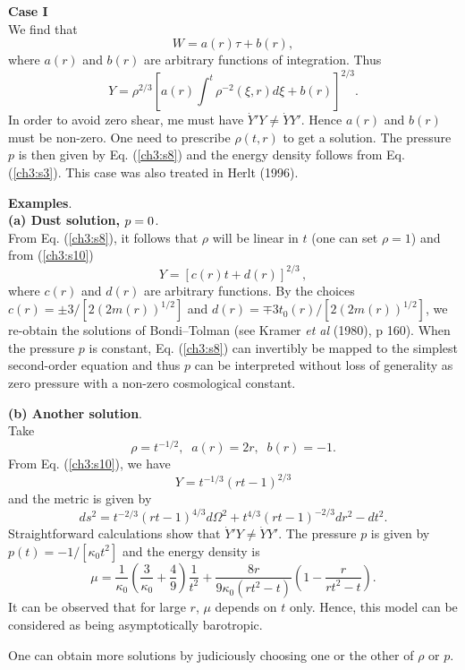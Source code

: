 {{\bf Case I  }\\
We find that
\[ W=a(r)\tau+b(r),\]
where $a(r)$ and $b(r)$ are arbitrary functions of integration.
Thus
\begin{equation}
Y=\rho^{2/3} \left [ a(r)\int^t \rho^{-2} (\xi,r)d\xi +b(r)\right ]^{2/3}.
\label{ch3:s10} \end{equation} In order to avoid zero shear, me must have
$\dot Y'Y\ne \dot YY'$. Hence $a(r)$ and $b(r)$ must be non-zero. 
One need to prescribe $\rho(t,r)$ to get a solution. The pressure $p$ is then given
by Eq. (\ref{ch3:s8}) and the energy density follows from Eq. (\ref{ch3:s3}). This case was also
treated in Herlt (1996).

{\bf Examples}.\\
{\bf (a) Dust solution, $\boldmath {p=0}$}.\\
From Eq. (\ref{ch3:s8}), it follows that $\rho$ will be linear in $t$ (one can set 
$\rho=1$) and from (\ref{ch3:s10})
$$ Y=[c(r)t+d(r)]^{2/3}\,,$$
where $c(r)$ and $d(r)$ are arbitrary functions. By the choices
$c(r)=\pm 3/[2(2m(r))^{1/2}]$ and $d(r)=\mp 3t_0(r)/[2(2m(r))^{1/2}]$,
we re-obtain the solutions of Bondi--Tolman
(see Kramer {\em et al} (1980), p 160).
When the pressure $p$ is constant, Eq. (\ref{ch3:s8}) can invertibly be
mapped to the simplest second-order equation and thus $p$ can be interpreted
without loss of generality as zero pressure with a non-zero cosmological constant.

{\bf (b) Another solution}.\\
Take \[\rho=t^{-1/2},\;\;a(r)=2r,\;\;b(r)=-1.\]
From Eq. (\ref{ch3:s10}), we have \[Y=t^{-1/3}(rt-1)^{2/3}\] and the metric is
given by \begin{equation} \label{ch3:met}
ds^2=t^{-2/3}(rt-1)^{4/3}d\Omega^2+t^{4/3}(rt-1)^{-2/3}dr^2-dt^2.
\end{equation} Straightforward calculations show that $\dot Y'Y\ne \dot
YY'$. The pressure $p$ is given by $ p(t)=-1/[\kappa_0 t^2] $ and
the energy density  is
\[\mu=\frac{1}{\kappa_0}\left (\frac{3}{\kappa_0}+\frac{4}{9}\right )
\frac{1}{t^2}+\frac{8r}{9\kappa_0(rt^2-t)}\left (1-\frac{r}{rt^2-t}\right).\]
It can be observed that for large $r$, $\mu$ depends on $t$ only. Hence,
this model can be considered as being asymptotically barotropic.

One can obtain more solutions by judiciously choosing one or the other
of $\rho$ or $p$.

}
